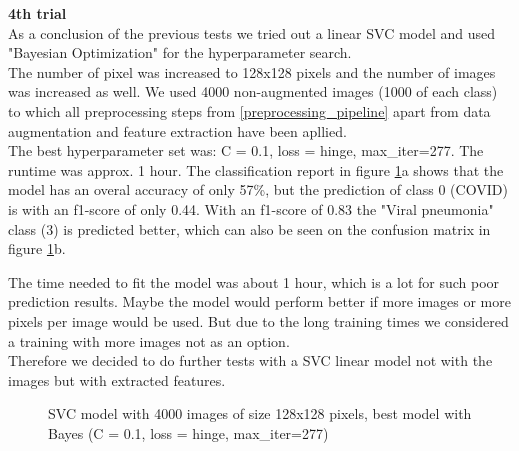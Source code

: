 \documentclass{article}
\begin{document}
\textbf{4th trial }\\
As a conclusion of the previous tests we tried out a linear SVC model and used "Bayesian Optimization" for the hyperparameter search.\\
The number of pixel was increased to 128x128 pixels and the number of images was increased as well. We used 4000 non-augmented images (1000 of each class) to  which all
preprocessing steps from \ref{preprocessing_pipeline} apart from data augmentation and feature extraction have been apllied. \\

The best hyperparameter set was: C = 0.1,  loss = hinge, max\_iter=277. The runtime was approx. 1 hour. The classification report in figure 
\ref{fig:SVC_4000_128x128_bayes}a shows that the model has an overal accuracy of only  57\%, but the prediction of class 0 (COVID) is  with an f1-score of 
only 0.44. With an f1-score of 0.83 the "Viral pneumonia" class (3) is predicted better, which can also be seen on the confusion matrix in figure 
\ref{fig:SVC_4000_128x128_bayes}b.

The time needed to fit the model was about 1 hour, which is a lot for such poor prediction results. Maybe the model would perform better if more images or more pixels 
per image would be used. But due to the long training times we considered a training with more images not as an option.\\
Therefore we decided to do further tests with a SVC linear model not with the images but with extracted features.\\

\begin{figure}[!ht]
  \centering
  \qquad
  \caption{SVC model with 4000 images of size 128x128 pixels, best model with Bayes (C = 0.1,  loss = hinge, max\_iter=277)}
  \label{fig:SVC_4000_128x128_bayes}
\end{figure}
\end{document}
